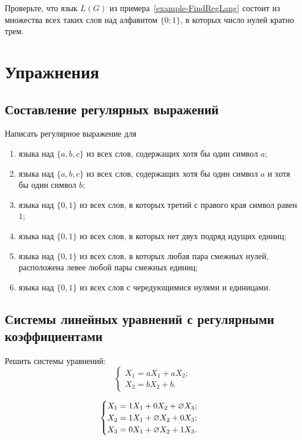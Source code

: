 \begin{myproblem}
Проверьте, что язык $L(G)$ из примера~\ref{example-FindRegLang} состоит из множества всех таких слов над алфавитом $\{0;1\}$, в которых число нулей кратно трем.
\end{myproblem}

\section{Упражнения}
\label{Chapter2Exs}

\subsection*{Составление регулярных выражений}

Написать регулярное выражение для
\begin{enumerate}
    \item языка над $\{a, b, c\}$ из всех слов, содержащих хотя бы один символ
    $a$;
    \item языка над $\{a, b, c\}$ из всех слов, содержащих хотя бы один символ
    $a$ и хотя бы один символ $b$;
    \item языка над $\{0, 1\}$ из всех слов, в которых третий с правого края
    символ равен $1$;
    \item языка над $\{0, 1\}$ из всех слов, в которых нет двух подряд идущих единиц;
    \item языка над $\{0, 1\}$ из всех слов, в которых любая пара смежных нулей,
     расположена левее любой пары смежных единиц;
    \item языка над $\{0, 1\}$ из всех слов с чередующимися нулями и единицами.
\end{enumerate}

\subsection*{Системы линейных уравнений с регулярными коэффициентами}

Решить системы уравнений:
\begin{equation}
    \begin{cases}
    X_1 = aX_1 + aX_2;\\
    X_2 = bX_2 + b.
    \end{cases}
\end{equation}

\begin{equation}
    \begin{cases}
        X_1 = 1X_1 + 0X_2 + \varnothing X_3; \\
        X_2 = 1X_1 + \varnothing X_2 + 0X_3; \\
        X_3 = 0X_1 + \varnothing X_2 + 1X_3.
    \end{cases}
\end{equation}

